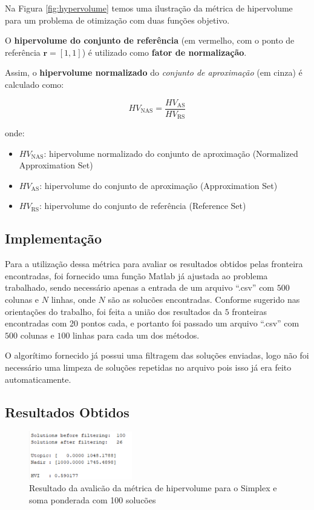 \documentclass[
	12pt,				%
	oneside,			%
	a4paper,			%
	chapter=TITLE,
	sumario=tradicional,
	english,			%
	brazil				%
]{abntex2}
\begin{document}
Na Figura \ref{fig:hypervolume} temos uma ilustração da métrica de hipervolume para um problema de otimização com duas funções objetivo.

O \textbf{hipervolume do conjunto de referência} (em vermelho, com o ponto de referência \( \mathbf{r} = [1, 1] \)) é utilizado como \textbf{fator de normalização}.

Assim, o \textbf{hipervolume normalizado} do \textit{conjunto de aproximação} (em cinza) é calculado como:

\[
HV_{\text{NAS}} = \frac{HV_{\text{AS}}}{HV_{\text{RS}}}
\]

onde:
\begin{itemize}
    \item \( HV_{\text{NAS}} \): hipervolume normalizado do conjunto de aproximação (Normalized Approximation Set)
    \item \( HV_{\text{AS}} \): hipervolume do conjunto de aproximação (Approximation Set)
    \item \( HV_{\text{RS}} \): hipervolume do conjunto de referência (Reference Set)
\end{itemize}

\subsection{Implementação}

Para a utilização dessa métrica para avaliar os resultados obtidos pelas fronteira encontradas, foi fornecido uma função Matlab já ajustada ao problema trabalhado,
sendo necessário apenas a entrada de um arquivo ``.csv'' com $500$ colunas e $N$ linhas, onde $N$ são as solucões encontradas. Conforme sugerido nas orientações do trabalho,
foi feita a união dos resultados da $5$ fronteiras encontradas com 20 pontos cada, e portanto foi passado um arquivo ``.csv'' com $500$ colunas e $100$ linhas para cada um dos
métodos.

O algorítimo fornecido já possui uma filtragem das soluções enviadas, logo não foi necessário uma limpeza de soluções repetidas no arquivo pois isso já era feito automaticamente.



\subsection{Resultados Obtidos}

\begin{figure}[h!]
	\caption{\label{fig:simplexHVI}Resultado da avalicão da métrica de hipervolume para o Simplex e soma ponderada com 100 solucões}
	\begin{center}
    \includegraphics[width=0.4\textwidth,trim=1 1 1 1,clip]{simplexHVI.png}
	\end{center}
\end{figure}
\end{document}
